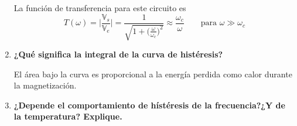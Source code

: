 \documentclass[a4paper,10pt,fleqn,oneside]{article}
\begin{document}
\begin{enumerate}[1.]
	La función de transferencia para este circuito es \[ T(\omega) = \Big| \frac{\mathbb{V}_s}{\mathbb{V}_e} \Big| = \frac{1}{\sqrt{1+\big( \frac{\omega}{\omega_c} \big)^2}}\approx \frac{\omega_c}{\omega} \qquad \text{para } \omega\gg \omega_c \]
	
	\item \textbf{¿Qué significa la integral de la curva de histéresis?}
	
	El área bajo la curva es proporcional a la energía perdida como calor durante la magnetización. 
	\item \textbf{¿Depende el comportamiento de hístéresis de la frecuencia?¿Y de la temperatura? Explique.}
	
\end{enumerate}
\end{document}

